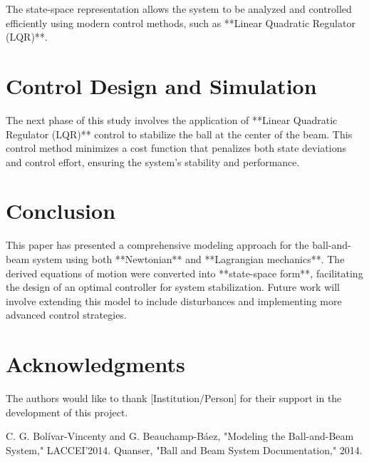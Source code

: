 \documentclass[conference]{IEEEtran}
\begin{document}
The state-space representation allows the system to be analyzed and controlled efficiently using modern control methods, such as **Linear Quadratic Regulator (LQR)**.

\section{Control Design and Simulation}
The next phase of this study involves the application of **Linear Quadratic Regulator (LQR)** control to stabilize the ball at the center of the beam. This control method minimizes a cost function that penalizes both state deviations and control effort, ensuring the system's stability and performance.

\section{Conclusion}
This paper has presented a comprehensive modeling approach for the ball-and-beam system using both **Newtonian** and **Lagrangian mechanics**. The derived equations of motion were converted into **state-space form**, facilitating the design of an optimal controller for system stabilization. Future work will involve extending this model to include disturbances and implementing more advanced control strategies.

\section*{Acknowledgments}
The authors would like to thank [Institution/Person] for their support in the development of this project.




\begin{thebibliography}{1}
 C. G. Bolívar-Vincenty and G. Beauchamp-Báez, "Modeling the Ball-and-Beam System," LACCEI’2014.
 Quanser, "Ball and Beam System Documentation," 2014.
\end{thebibliography}
\end{document}
